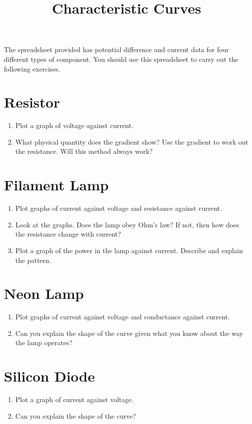 \documentclass{article}
\title{Characteristic Curves}
\date{}
\begin{document}
\maketitle The spreadsheet provided has potential difference and current data for four different types of component. You should use this spreadsheet to carry out the following exercises.

\section{Resistor}
\begin{enumerate}
    \item Plot a graph of voltage against current.
    \item What physical quantity does the gradient show? Use the gradient to work out the resistance. Will this method always work?
\end{enumerate}

\section{Filament Lamp}
\begin{enumerate}
    \item Plot graphs of current against voltage and resistance against current.
    \item Look at the graphs. Does the lamp obey Ohm's law? If not, then how does the resistance change with current?
    \item Plot a graph of the power in the lamp against current. Describe and explain the pattern.
\end{enumerate}
\section{Neon Lamp}
\begin{enumerate}
    \item Plot graphs of current against voltage and conductance against current.
    \item Can you explain the shape of the curve given what you know about the way the lamp operates?
\end{enumerate}
\section{Silicon Diode}
\begin{enumerate}
    \item Plot a graph of current against voltage.
    \item Can you explain the shape of the curve?
\end{enumerate}
\end{document}
